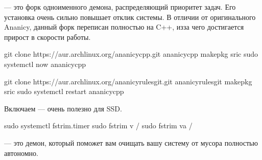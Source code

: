 \documentclass[letterpaper,10pt,russian,openany]{sphinxmanual}
\begin{document}
\sphinxAtStartPar
{}  — это форк одноименного демона, распределяющий приоритет задач. Его установка очень сильно повышает отклик системы. В отличии от оригинального Ananicy, данный форк переписан полностью на C++, из\sphinxhyphen{}за чего достигается прирост в скорости работы.

\begin{sphinxVerbatim}[commandchars=\\\{\}]
git clone https://aur.archlinux.org/ananicy\PYGZhy{}cpp.git 
 ananicy\PYGZhy{}cpp                                      
makepkg \PYGZhy{}sric                                       
sudo systemctl  \PYGZhy{}\PYGZhy{}now ananicy\PYGZhy{}cpp             

git clone https://aur.archlinux.org/ananicy\PYGZhy{}rules\PYGZhy{}git.git 
 ananicy\PYGZhy{}rules\PYGZhy{}git                                      
makepkg \PYGZhy{}sric                                             
sudo systemctl restart ananicy\PYGZhy{}cpp                        
\end{sphinxVerbatim}

\sphinxAtStartPar
{} Включаем  — очень полезно для SSD.

\begin{sphinxVerbatim}[commandchars=\\\{\}]
sudo systemctl  fstrim.timer    
sudo fstrim \PYGZhy{}v /                      
sudo fstrim \PYGZhy{}va /                     
\end{sphinxVerbatim}

\sphinxAtStartPar
{}  — это демон, который поможет вам очищать вашу систему от мусора полностью автономно.
\end{document}
